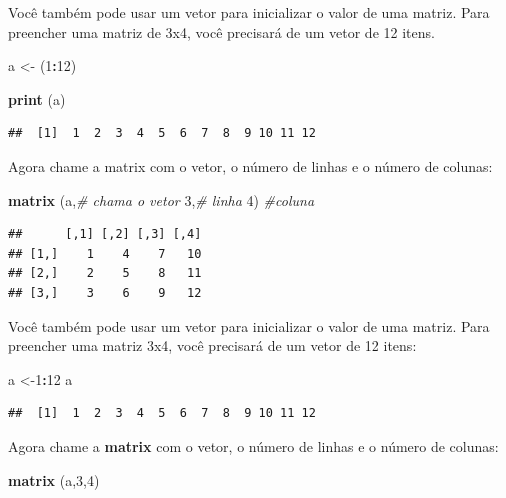 \documentclass[
]{book}
\newenvironment{Shaded}{\begin{snugshade}}{\end{snugshade}}
\newcommand{\CommentTok}[1]{\textcolor[rgb]{0.56,0.35,0.01}{\textit{#1}}}
\newcommand{\DecValTok}[1]{\textcolor[rgb]{0.00,0.00,0.81}{#1}}
\newcommand{\KeywordTok}[1]{\textcolor[rgb]{0.13,0.29,0.53}{\textbf{#1}}}
\newcommand{\NormalTok}[1]{#1}
\newcommand{\OperatorTok}[1]{\textcolor[rgb]{0.81,0.36,0.00}{\textbf{#1}}}
\newcommand{\StringTok}[1]{\textcolor[rgb]{0.31,0.60,0.02}{#1}}
\begin{document}
Você também pode usar um vetor para inicializar o valor de uma matriz. Para preencher uma matriz de 3x4, você precisará de um vetor de 12 itens.

\begin{Shaded}
\begin{Highlighting}[]
\NormalTok{a <-}\StringTok{ }\NormalTok{(}\DecValTok{1}\OperatorTok{:}\DecValTok{12}\NormalTok{)}

\KeywordTok{print}\NormalTok{ (a)}
\end{Highlighting}
\end{Shaded}

\begin{verbatim}
##  [1]  1  2  3  4  5  6  7  8  9 10 11 12
\end{verbatim}

Agora chame a matrix com o vetor, o número de linhas e o número de colunas:

\begin{Shaded}
\begin{Highlighting}[]
\KeywordTok{matrix}\NormalTok{ (a,}\CommentTok{# chama o vetor}
        \DecValTok{3}\NormalTok{,}\CommentTok{# linha}
        \DecValTok{4}\NormalTok{) }\CommentTok{#coluna}
\end{Highlighting}
\end{Shaded}

\begin{verbatim}
##      [,1] [,2] [,3] [,4]
## [1,]    1    4    7   10
## [2,]    2    5    8   11
## [3,]    3    6    9   12
\end{verbatim}

Você também pode usar um vetor para inicializar o valor de uma matriz. Para preencher uma matriz 3x4, você precisará de um vetor de 12 itens:

\begin{Shaded}
\begin{Highlighting}[]
\NormalTok{a <-}\DecValTok{1}\OperatorTok{:}\DecValTok{12}
\NormalTok{a}
\end{Highlighting}
\end{Shaded}

\begin{verbatim}
##  [1]  1  2  3  4  5  6  7  8  9 10 11 12
\end{verbatim}

Agora chame a \textbf{matrix} com o vetor, o número de linhas e o número de colunas:

\begin{Shaded}
\begin{Highlighting}[]
\KeywordTok{matrix}\NormalTok{ (a,}\DecValTok{3}\NormalTok{,}\DecValTok{4}\NormalTok{)}
\end{Highlighting}
\end{Shaded}
\end{document}
